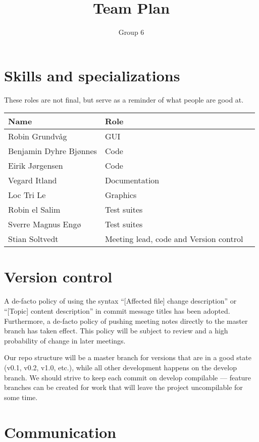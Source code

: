 \documentclass{article}
\title{Team Plan}
\author{Group 6}
\begin{document}
\maketitle

\section*{Skills and specializations}

These roles are not final, but serve as a reminder of what people are good at. \\

\begin{tabular}{l l l}
    Name                   & Role \\
    \midrule
    Robin Grundvåg         & GUI \\
    Benjamin Dyhre Bjønnes & Code \\
    Eirik Jørgensen        & Code \\
    Vegard Itland          & Documentation \\
    Loc Tri Le             & Graphics \\
    Robin el Salim         & Test suites \\
    Sverre Magnus Engø     & Test suites \\
    Stian Soltvedt         & Meeting lead, code and Version control \\
\end{tabular}

\section*{Version control}

A de-facto policy of using the syntax ``[Affected file] change description'' or ``[Topic] content description'' in commit message titles has been adopted. Furthermore, a de-facto policy of pushing meeting notes directly to the master branch has taken effect. This policy will be subject to review and a high probability of change in later meetings.

Our repo structure will be a master branch for versions that are in a good state (v0.1, v0.2, v1.0, etc.), while all other development happens on the develop branch. We should strive to keep each commit on develop compilable --- feature branches can be created for work that will leave the project uncompilable for some time.

\section*{Communication}
\end{document}

